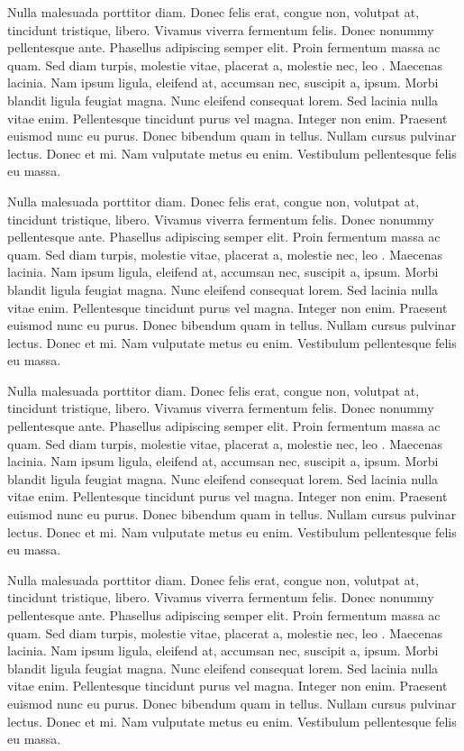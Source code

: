 \documentclass{wber}
\begin{document}
Nulla malesuada porttitor diam. Donec felis erat, congue non, volutpat at, tincidunt tristique, libero. Vivamus viverra
fermentum felis. Donec nonummy pellentesque ante. Phasellus adipiscing semper elit. Proin fermentum massa ac
quam. Sed diam turpis, molestie vitae, placerat a, molestie nec, leo \citep{howells-66-pop}. Maecenas lacinia. Nam ipsum ligula, eleifend
at, accumsan nec, suscipit a, ipsum. Morbi blandit ligula feugiat magna. Nunc eleifend consequat lorem. Sed lacinia
nulla vitae enim. Pellentesque tincidunt purus vel magna. Integer non enim. Praesent euismod nunc eu purus. Donec
bibendum quam in tellus. Nullam cursus pulvinar lectus. Donec et mi. Nam vulputate metus eu enim. Vestibulum
pellentesque felis eu massa.

Nulla malesuada porttitor diam. Donec felis erat, congue non, volutpat at, tincidunt tristique, libero. Vivamus viverra
fermentum felis. Donec nonummy pellentesque ante. Phasellus adipiscing semper elit. Proin fermentum massa ac
quam. Sed diam turpis, molestie vitae, placerat a, molestie nec, leo \citep{howells-66-var}. Maecenas lacinia. Nam ipsum ligula, eleifend
at, accumsan nec, suscipit a, ipsum. Morbi blandit ligula feugiat magna. Nunc eleifend consequat lorem. Sed lacinia
nulla vitae enim. Pellentesque tincidunt purus vel magna. Integer non enim. Praesent euismod nunc eu purus. Donec
bibendum quam in tellus. Nullam cursus pulvinar lectus. Donec et mi. Nam vulputate metus eu enim. Vestibulum
pellentesque felis eu massa.

Nulla malesuada porttitor diam. Donec felis erat, congue non, volutpat at, tincidunt tristique, libero. Vivamus viverra
fermentum felis. Donec nonummy pellentesque ante. Phasellus adipiscing semper elit. Proin fermentum massa ac
quam. Sed diam turpis, molestie vitae, placerat a, molestie nec, leo \citep{johnson-74}. Maecenas lacinia. Nam ipsum ligula, eleifend
at, accumsan nec, suscipit a, ipsum. Morbi blandit ligula feugiat magna. Nunc eleifend consequat lorem. Sed lacinia
nulla vitae enim. Pellentesque tincidunt purus vel magna. Integer non enim. Praesent euismod nunc eu purus. Donec
bibendum quam in tellus. Nullam cursus pulvinar lectus. Donec et mi. Nam vulputate metus eu enim. Vestibulum
pellentesque felis eu massa.

Nulla malesuada porttitor diam. Donec felis erat, congue non, volutpat at, tincidunt tristique, libero. Vivamus viverra
fermentum felis. Donec nonummy pellentesque ante. Phasellus adipiscing semper elit. Proin fermentum massa ac
quam. Sed diam turpis, molestie vitae, placerat a, molestie nec, leo \citep{johnson-howells}. Maecenas lacinia. Nam ipsum ligula, eleifend
at, accumsan nec, suscipit a, ipsum. Morbi blandit ligula feugiat magna. Nunc eleifend consequat lorem. Sed lacinia
nulla vitae enim. Pellentesque tincidunt purus vel magna. Integer non enim. Praesent euismod nunc eu purus. Donec
bibendum quam in tellus. Nullam cursus pulvinar lectus. Donec et mi. Nam vulputate metus eu enim. Vestibulum
pellentesque felis eu massa.
\end{document}
